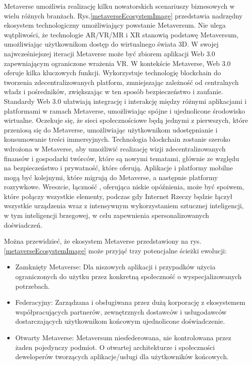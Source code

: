 Metaverse umożliwia realizację kilku nowatorskich scenariuszy biznesowych w wielu różnych branżach. Rys.\ref{metaverseEcosystemImage} przedstawia nadrzędny ekosystem technologiczny umożliwiający powstanie Metaversum. Nie ulega wątpliwości, że technologie AR/VR/MR i XR stanowią podstawę Metaversum, umożliwiając użytkownikom dostęp do wirtualnego świata 3D. W swojej najwcześniejszej iteracji Metaverse może być zbiorem aplikacji Web 3.0 zapewniającym ograniczone wrażenia VR. W kontekście Metaverse, Web 3.0 oferuje kilka kluczowych funkcji. Wykorzystuje technologię blockchain do tworzenia zdecentralizowanych platform, zmniejszając zależność od centralnych władz i pośredników, zwiększając w ten sposób bezpieczeństwo i zaufanie. Standardy Web 3.0 ułatwiają integrację i interakcję między różnymi aplikacjami i platformami w ramach Metaverse, umożliwiając spójne i ujednolicone środowisko wirtualne. Oczekuje się, że sieci społecznościowe będą jednymi z pierwszych, które przeniosą się do Metaverse, umożliwiając użytkownikom udostępnianie i konsumowanie treści immersyjnych. Technologia blockchain zostanie szeroko wdrożona w Metaverse, aby umożliwić realizację wizji zdecentralizowanych finansów i gospodarki twórców, które są nowymi tematami, głównie ze względu na bezpieczeństwo i prywatność, które oferują. Aplikacje i platformy mobilne mogą być kolejnymi, które migrują do Metaverse, a następnie platformy rozrywkowe. Wreszcie, łączność , oferująca niskie opóźnienia, może być spoiwem, które połączy wszystkie elementy, podczas gdy Internet Rzeczy będzie łączył wszystkie urządzenia wraz z intensywnym wykorzystaniem sztucznej inteligencji, w tym inteligencji brzegowej, w celu zapewnienia spersonalizowanych doświadczeń\cite{metaverseSecurityIssuesChallengesAndViableZTAModel}.


Można przewidzieć, że ekosystem Metaverse przedstawiony na rys.\ref{metaverseEcosystemImage} może przyjąć trzy potencjalne ścieżki ewolucji:

\begin{itemize}
    \item Zamknięty Metaverse: Dla niszowych aplikacji i przypadków użycia ograniczonych do użytku przez konkretną społeczność o wyspecjalizowanych potrzebach.
    \item Federacyjny: Zarządzana i obsługiwana przez dużą korporację z ekosystemem współpracujących partnerów, zewnętrznych dostawców i usługodawców dostarczających użytkownikom końcowym ujednolicone doświadczenie.
    \item Otwarty Metaverse: Metaversum niesfederowana, nie kontrolowana przez żaden pojedynczy podmiot. O otwartej architekturze i społeczności deweloperów tworzących aplikacje/usługi dla użytkowników końcowych.
\end{itemize}



